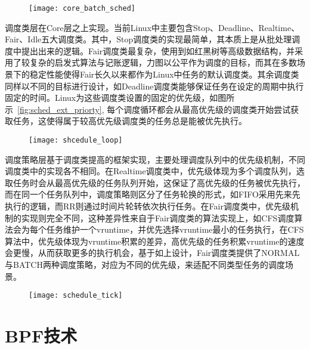 \begin{figure}[!htbp]
    \centering
    \texttt{[image: core\_batch\_sched]}
    \label{fig:core_batch_sched}
\end{figure}

调度类层在Core层之上实现。当前Linux中主要包含Stop、Deadline、Realtime、Fair、Idle五大调度类\citep{scheduler}。其中，Stop调度类的实现最简单，其本质上是从批处理调度中提出出来的逻辑。Fair调度类最复杂，使用到如红黑树等高级数据结构，并采用了较复杂的启发式算法与记账逻辑，力图以公平作为调度的目标，而其在多数场景下的稳定性能使得Fair长久以来都作为Linux中任务的默认调度类。其余调度类同样以不同的目标进行设计，如Deadline调度类能够保证任务在设定的周期中执行固定的时间。Linux为这些调度类设置的固定的优先级，如图所示~\ref{fig:sched_ext_priorty}, 每个调度循环都会从最高优先级的调度类开始尝试获取任务，这使得属于较高优先级调度类的任务总是能被优先执行。

\begin{figure}[!htbp]
    \centering 
    \texttt{[image: shcedule\_loop]}
    \label{fig:shcedule_loop}
\end{figure}

调度策略层基于调度类提高的框架实现，主要处理调度队列中的优先级机制，不同调度类中的实现各不相同。在Realtime调度类中，优先级体现为多个调度队列，选取任务时会从最高优先级的任务队列开始，这保证了高优先级的任务被优先执行，而在同一个任务队列中，调度策略则区分了任务轮换的形式，如FIFO采用先来先执行的逻辑，而RR则通过时间片轮转依次执行任务。在Fair调度类中，优先级机制的实现则完全不同，这种差异性来自于Fair调度类的算法实现上，如CFS调度算法会为每个任务维护一个vruntime，并优先选择vruntime最小的任务执行，在CFS算法中，优先级体现为vruntime积累的差异，高优先级的任务积累vruntime的速度会更慢，从而获取更多的执行机会，基于如上设计，Fair调度类提供了NORMAL与BATCH两种调度策略，对应为不同的优先级，来适配不同类型任务的调度场景。

\begin{figure}[!htbp]
    \centering
    \texttt{[image: schedule\_tick]}
    \label{fig:schedule_tick}
\end{figure}

\section{BPF技术}

